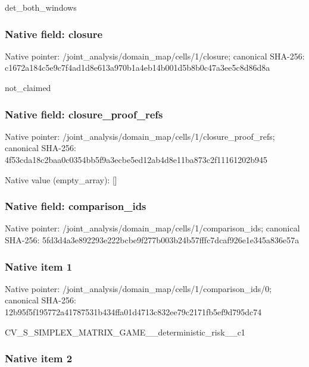 \documentclass[10pt,a4paper]{article}
\begin{document}
det\_both\_windows


\subsubsection{Native field: closure}


Native pointer: /joint\_analysis/domain\_m\allowbreak{}ap/cells/1/closure; canonical SHA-256: c1672a184c5e9c7f4ad1d8e6\allowbreak{}13a970b1a4eb14b001d5b8b0\allowbreak{}c47a3ee5c8d86d8a


not\_claimed


\subsubsection{Native field: closure\_proof\_refs}


Native pointer: /joint\_analysis/domain\_m\allowbreak{}ap/cells/1/closure\_proof\allowbreak{}\_refs; canonical SHA-256: 4f53cda18c2baa0c0354bb5f\allowbreak{}9a3ecbe5ed12ab4d8e11ba87\allowbreak{}3c2f11161202b945



Native value (empty\_array): []



\subsubsection{Native field: comparison\_ids}


Native pointer: /joint\_analysis/domain\_m\allowbreak{}ap/cells/1/comparison\_id\allowbreak{}s; canonical SHA-256: 5fd3d4a3e892293e222bcbe9\allowbreak{}f277b003b24b57fffc7dcaf9\allowbreak{}26e1e345a836e57a



\subsubsection{Native item 1}


Native pointer: /joint\_analysis/domain\_m\allowbreak{}ap/cells/1/comparison\_id\allowbreak{}s/0; canonical SHA-256: 12b95f5f195772a41787531b\allowbreak{}434ffa01d4713c832ee79c21\allowbreak{}71fb5ef9d795dc74


CV\_S\_SIMPLEX\_MATRIX\_GAME\allowbreak{}\_\_deterministic\_risk\_\_c1


\subsubsection{Native item 2}
\end{document}
